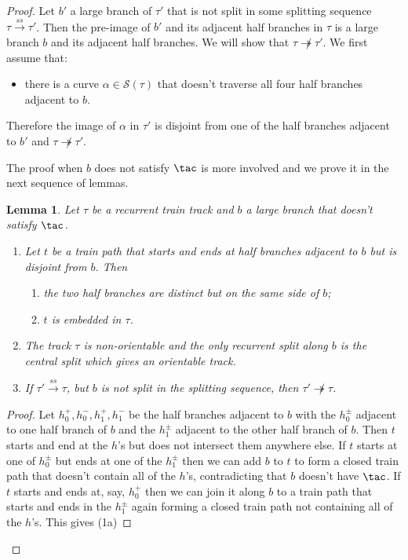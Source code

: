 \documentclass[11pt]{article}
\newtheorem{lemma}[thm]{Lemma}
\theoremstyle{remark}
\def\S{{\mathcal S}}
\def\ss{{\overset{ss}\longrightarrow}}
\begin{document}
\begin{proof}
Let $b'$ a large branch of $\tau'$ that is not split in some splitting sequence $\tau\ss\tau'$. 
Then the pre-image of $b'$ and its adjacent half branches in $\tau$ is a large branch $b$ and its adjacent half branches. We will show that $\tau\not\twoheadrightarrow \tau'$.
We first assume that:
\begin{itemize}
\item[\tac] there is a curve $\alpha \in \S(\tau)$ that doesn't traverse all four half branches adjacent to $b$.
\end{itemize}
 Therefore the image of $\alpha$ in $\tau'$ is disjoint from one of the half branches adjacent to $b'$ and $\tau\not\twoheadrightarrow\tau'$.

The proof when $b$ does not satisfy $\tac$ is more involved and we prove it in the next sequence of lemmas.

\begin{lemma}\label{bad_branch}
Let $\tau$ be a recurrent train track and $b$ a large branch that doesn't satisfy $\tac$. 
\begin{enumerate}
\item Let $t$ be a train path that starts and ends at half branches adjacent to $b$ but is disjoint from $b$. Then
\begin{enumerate}
\item the two half branches are distinct but on the same side of $b$;
\item  $t$ is embedded in $\tau$.
\end{enumerate}

\item The track $\tau$ is non-orientable and the only recurrent split along $b$ is the central split which gives an orientable track.

\item If $\tau'\ss\tau$, but $b$ is not split in the splitting sequence, then $\tau'\not\twoheadrightarrow\tau$.
\end{enumerate}
\end{lemma}

\begin{proof}
Let $h_0^+, h_0^-, h_1^+, h_1^-$ be the half branches adjacent to $b$
with the $h_0^\pm$ adjacent to one half branch of $b$ and the
$h_1^\pm$ adjacent to the other half branch of $b$. Then $t$
starts and end at the $h$'s but does not intersect them anywhere
else. If $t$ starts at one of $h_0^\pm$ but ends at one of the
$h_1^\pm$ then we can add $b$ to $t$ to form a closed train path that
doesn't contain all of the $h$'s, contradicting that $b$ doesn't have
$\tac$. If $t$ starts and ends at, say, $h_0^+$ then we can join it
along $b$ to a train path that starts and ends in the $h^\pm_1$ again forming a closed train path not containing all of the $h$'s. This gives (1a)


\end{proof}
\end{proof}
\end{document}
